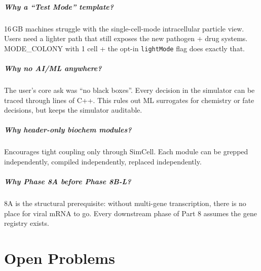 \documentclass[11pt,letterpaper,twoside,openany]{book}
\newcommand{\code}[1]{\texttt{#1}}
\begin{document}
\paragraph{Why a ``Test Mode'' template?} 16\,GB machines
struggle with the single-cell-mode intracellular particle view.
Users need a lighter path that still exposes the new pathogen +
drug systems. MODE\_COLONY with 1 cell + the opt-in
\code{lightMode} flag does exactly that.

\paragraph{Why no AI/ML anywhere?} The user's core ask was
``no black boxes''. Every decision in the simulator can be
traced through lines of C++. This rules out ML surrogates for
chemistry or fate decisions, but keeps the simulator auditable.

\paragraph{Why header-only biochem modules?} Encourages tight
coupling only through SimCell. Each module can be grepped
independently, compiled independently, replaced independently.

\paragraph{Why Phase 8A before Phase 8B-L?} 8A is the
structural prerequisite: without multi-gene transcription, there
is no place for viral mRNA to go. Every downstream phase of Part
8 assumes the gene registry exists.

\chapter{Open Problems}
\label{ch:open}
\end{document}
